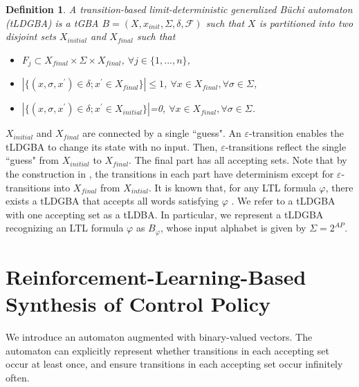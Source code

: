 \documentclass[letterpaper, 10 pt, conference]{ieeeconf}  %
\newtheorem{definition}{Definition}
\begin{document}
\begin{definition}
  A transition-based limit-deterministic generalized B\"{u}chi automaton (tLDGBA) is a tGBA $B = (X, x_{init},\Sigma,\delta,\mathcal{F})$ such that $X$ is partitioned into two disjoint sets $X_{initial}$ and $X_{final}$ such that
  \begin{itemize}
    \item $F_j \subset X_{final} \times \Sigma \times X_{final}$, $\forall j \in \{ 1,...,n \}$,
    \item $| \{ (x, \sigma, x^{\prime}) \in \delta; x^{\prime} \in X_{final} \} | \! \leq \! 1$, $\forall x \! \in \! X_{final}, \forall \sigma \! \in \! \Sigma$,
    \item $| \{ (x, \sigma, x^{\prime}) \in \delta; x^{\prime} \in X_{initial} \} |$=0, $\forall x \! \in \! X_{final}, \forall \sigma \! \in \! \Sigma$.
  \end{itemize}
\end{definition}
 $X_{initial}$ and $X_{final}$ are connected by a single ``guess". An $\varepsilon$-transition enables the tLDGBA to change its state with no input. Then, $\varepsilon$-transitions reflect the single ``guess" from $X_{initial}$ to $X_{final}$. The final part has all accepting sets. Note that by the construction in \cite{SEJK2016}, the transitions in each part have determinism except for $\varepsilon$-transitions into $X_{final}$ from $X_{intial}$.
It is known that, for any LTL formula $ \varphi $, there exists a tLDGBA that accepts all words satisfying $\varphi$ \cite{SEJK2016}. We refer to a tLDGBA with one accepting set as a tLDBA.
In particular, we represent a tLDGBA recognizing an LTL formula $\varphi$ as $B_{\varphi}$, whose input alphabet is given by $ \Sigma = 2^{AP} $.

\section{Reinforcement-Learning-Based Synthesis of Control Policy}
We introduce an automaton augmented with binary-valued vectors. The automaton can explicitly represent whether transitions in each accepting set occur at least once, and ensure transitions in each accepting set occur infinitely often.
\end{document}
